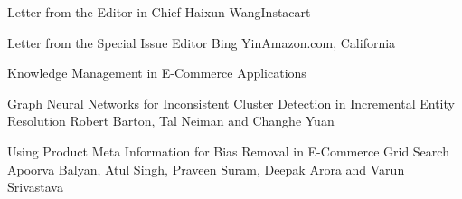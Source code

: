 \documentclass[11pt]{article}
\begin{document}


\begin{bulletin}


%
%

\begin{lettersection}


\begin{letter}{Letter from the Editor-in-Chief}
{Haixun Wang}{Instacart}

\end{letter}
%
\newpage
%
%
\begin{letter}{Letter from the Special Issue Editor} 
{Bing Yin}{Amazon.com, California}


\end{letter}
\end{lettersection}

\begin{articlesection}{Knowledge Management in E-Commerce Applications}


\begin{article}
{Graph Neural Networks for Inconsistent Cluster Detection in Incremental Entity Resolution}
{Robert Barton, Tal Neiman and Changhe Yuan}

\end{article}

\begin{article}
{Using Product Meta Information for Bias Removal in E-Commerce Grid Search}
{Apoorva Balyan, Atul Singh, Praveen Suram, Deepak Arora and Varun Srivastava}

\end{article}


\end{articlesection}
\end{bulletin}
\end{document}
